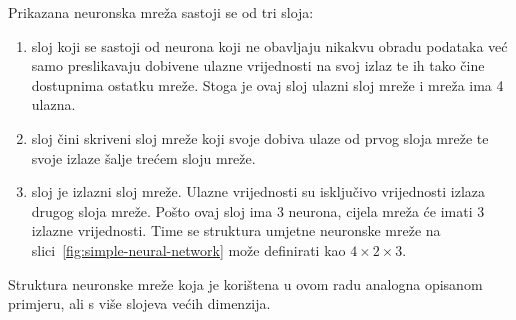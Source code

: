 Prikazana neuronska mreža sastoji se od tri sloja:
\begin{enumerate}
    \item sloj koji se sastoji od neurona koji ne obavljaju nikakvu obradu podataka već samo preslikavaju dobivene
    ulazne vrijednosti na svoj izlaz te ih tako čine dostupnima ostatku mreže. Stoga je ovaj sloj ulazni sloj mreže i
    mreža ima 4 ulazna.
    \item sloj čini skriveni sloj mreže koji svoje dobiva ulaze od prvog sloja mreže te svoje izlaze šalje trećem sloju
    mreže.
    \item sloj je izlazni sloj mreže. Ulazne vrijednosti su isključivo vrijednosti izlaza drugog sloja mreže. Pošto ovaj
    sloj ima 3 neurona, cijela mreža će imati 3 izlazne vrijednosti. Time se struktura umjetne neuronske mreže na
    slici\ \ref{fig:simple-neural-network} može definirati kao $4 \times 2 \times 3$.
\end{enumerate}
Struktura neuronske mreže koja je korištena u ovom radu analogna opisanom primjeru, ali s više slojeva većih dimenzija.


